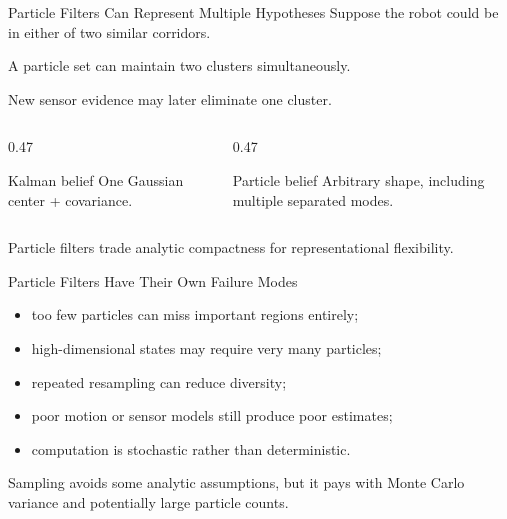 \documentclass[aspectratio=169,10pt]{beamer}
\begin{document}
\begin{frame}[shrink=10]{Particle Filters Can Represent Multiple Hypotheses}
  Suppose the robot could be in either of two similar corridors.

  A particle set can maintain two clusters simultaneously.

  New sensor evidence may later eliminate one cluster.

  \begin{columns}[T,onlytextwidth]
    \begin{column}{0.47\textwidth}
      \begin{block}{Kalman belief}
        One Gaussian center + covariance.
      \end{block}
    \end{column}
    \begin{column}{0.47\textwidth}
      \begin{block}{Particle belief}
        Arbitrary shape, including multiple separated modes.
      \end{block}
    \end{column}
  \end{columns}

  \begin{keyidea}
    Particle filters trade analytic compactness for representational flexibility.
  \end{keyidea}
\end{frame}

\begin{frame}[shrink=10]{Particle Filters Have Their Own Failure Modes}
  \begin{itemize}
    \item too few particles can miss important regions entirely;
    \item high-dimensional states may require very many particles;
    \item repeated resampling can reduce diversity;
    \item poor motion or sensor models still produce poor estimates;
    \item computation is stochastic rather than deterministic.
  \end{itemize}

  \begin{keyidea}
    Sampling avoids some analytic assumptions, but it pays with Monte Carlo variance and potentially large particle counts.
  \end{keyidea}
\end{frame}
\end{document}
